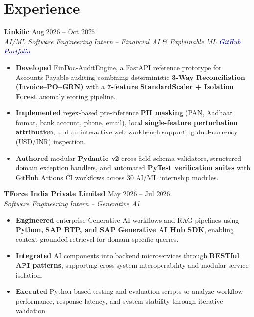 \documentclass[a4paper,10pt]{article}
\newcommand{\navylink}[2]{\href{#1}{\textcolor{navy}{\uline{#2}}}}
\begin{document}
\section{Experience}
\textbf{Linkific} \hfill \textcolor{dategray}{Aug 2026 -- Oct 2026} \\
\textit{AI/ML Software Engineering Intern -- Financial AI \& Explainable ML} \hfill {\fontsize{8.6}{10}\selectfont\itshape\navylink{https://github.com/Shri-Sanjaykumar/Linkific-Tasks}{GitHub Portfolio}}
\begin{itemize}[leftmargin=0.19in, itemsep=1pt, topsep=2pt, parsep=0pt]
    \item \textbf{Developed} FinDoc-AuditEngine, a FastAPI reference prototype for Accounts Payable auditing combining deterministic \textbf{3-Way Reconciliation (Invoice--PO--GRN)} with a \textbf{7-feature StandardScaler + Isolation Forest} anomaly scoring pipeline.
    \item \textbf{Implemented} regex-based pre-inference \textbf{PII masking} (PAN, Aadhaar format, bank account, phone, email), local \textbf{single-feature perturbation attribution}, and an interactive web workbench supporting dual-currency (USD/INR) inspection.
    \item \textbf{Authored} modular \textbf{Pydantic v2} cross-field schema validators, structured domain exception handlers, and automated \textbf{PyTest verification suites} with GitHub Actions CI workflows across 30 AI/ML internship modules.
\end{itemize}
\vspace{2pt}

\textbf{TForce India Private Limited} \hfill \textcolor{dategray}{May 2026 -- Jul 2026} \\
\textit{Software Engineering Intern -- Generative AI}
\begin{itemize}[leftmargin=0.19in, itemsep=1pt, topsep=2pt, parsep=0pt]
    \item \textbf{Engineered} enterprise Generative AI workflows and RAG pipelines using \textbf{Python, SAP BTP, and SAP Generative AI Hub SDK}, enabling context-grounded retrieval for domain-specific queries.
    \item \textbf{Integrated} AI components into backend microservices through \textbf{RESTful API patterns}, supporting cross-system interoperability and modular service isolation.
    \item \textbf{Executed} Python-based testing and evaluation scripts to analyze workflow performance, response latency, and system stability through iterative validation.
\end{itemize}
\end{document}
